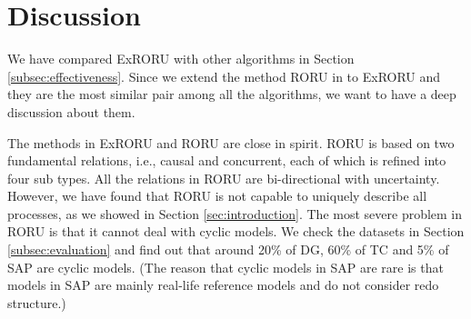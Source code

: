 \documentclass{llncs}
\begin{document}
\section{Discussion}\label{sec:discussion}
We have compared ExRORU with other algorithms in Section \ref{subsec:effectiveness}. Since we extend the method RORU in \cite{jin2014computing} to ExRORU and they are the most similar pair among all the algorithms, we want to have a deep discussion about them.

The methods in ExRORU and RORU are close in spirit. RORU is based on two fundamental relations, i.e., causal and concurrent, each of which is refined into four sub types. All the relations in RORU are bi-directional with uncertainty. However, we have found that RORU is not capable to uniquely describe all processes, as we showed in Section \ref{sec:introduction}. The most severe problem in RORU is that it cannot deal with cyclic models. We check the datasets in Section \ref{subsec:evaluation} and find out that around 20\% of DG, 60\% of TC and 5\% of SAP are cyclic models. (The reason that cyclic models in SAP are rare is that models in SAP are mainly real-life reference models and do not consider redo structure.)
\end{document}

